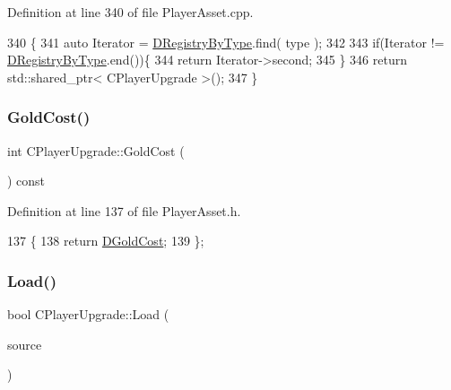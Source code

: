 Definition at line 340 of file Player\+Asset.\+cpp.


\begin{DoxyCode}
340                                                                                             \{
341     \textcolor{keyword}{auto} Iterator = \hyperlink{classCPlayerUpgrade_a04673f65215501e9eb0ce7828091c30c}{DRegistryByType}.find( type );
342     
343     \textcolor{keywordflow}{if}(Iterator != \hyperlink{classCPlayerUpgrade_a04673f65215501e9eb0ce7828091c30c}{DRegistryByType}.end())\{
344         \textcolor{keywordflow}{return} Iterator->second;    
345     \}
346     \textcolor{keywordflow}{return} std::shared\_ptr< CPlayerUpgrade >();
347 \}
\end{DoxyCode}
\hypertarget{classCPlayerUpgrade_aabf9817c5a79f857c2633cb553c30e8a}{}\label{classCPlayerUpgrade_aabf9817c5a79f857c2633cb553c30e8a} 
\subsubsection{\texorpdfstring{Gold\+Cost()}{GoldCost()}}
{\footnotesize\ttfamily int C\+Player\+Upgrade\+::\+Gold\+Cost (\begin{DoxyParamCaption}{ }\end{DoxyParamCaption}) const\hspace{0.3cm}{\ttfamily [inline]}}



Definition at line 137 of file Player\+Asset.\+h.


\begin{DoxyCode}
137                             \{
138             \textcolor{keywordflow}{return} \hyperlink{classCPlayerUpgrade_ab542fa525d263bf54ee75bddb486471c}{DGoldCost};  
139         \};
\end{DoxyCode}
\hypertarget{classCPlayerUpgrade_a685fab69765ef63952cdbcaa6b1b927b}{}\label{classCPlayerUpgrade_a685fab69765ef63952cdbcaa6b1b927b} 
\subsubsection{\texorpdfstring{Load()}{Load()}}
{\footnotesize\ttfamily bool C\+Player\+Upgrade\+::\+Load (\begin{DoxyParamCaption}\item[{std\+::shared\+\_\+ptr$<$ \hyperlink{classCDataSource}{C\+Data\+Source} $>$}]{source }\end{DoxyParamCaption})\hspace{0.3cm}{\ttfamily [static]}}



